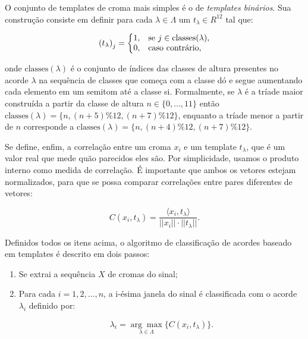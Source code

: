     O conjunto de templates de croma mais simples é o de \textit{templates binários}. Sua construção consiste em definir para cada $\lambda \in \Lambda$ um $t_\lambda \in R^{12}$ tal que:
    
    \[
        {(t_\lambda)}_j = \left\{
            \begin{array}{@{}ll@{}}
                1, & \textrm{se}\ j \in \mbox{classes}(\lambda)\mbox{,} \\
                0, & \textrm{caso contrário}\mbox{,}
            \end{array}\right.
    \]
    
    \noindent onde $\mbox{classes}(\lambda)$ é o conjunto de índices das classes de altura presentes no acorde $\lambda$ na sequência de classes que começa com a classe dó e segue aumentando cada elemento em um semitom até a classe si. Formalmente, se $\lambda$ é a tríade maior construída a partir da classe de altura $n\in\{0,\ldots,11\}$ então $\mbox{classes}(\lambda)=\{n,(n+5)\% 12,(n+7)\% 12\}$, enquanto a tríade menor a partir de $n$ corresponde a $\mbox{classes}(\lambda)=\{n,(n+4)\% 12,(n+7)\% 12\}$.

    Se define, enfim, a correlação entre um croma $x_i$ e um template $t_\lambda$, que é um valor real que mede quão parecidos eles são. Por simplicidade, usamos o produto interno como medida de correlação. É importante que ambos os vetores estejam normalizados, para que se possa comparar correlações entre pares diferentes de vetores:
    
    \[
        C(x_i, t_\lambda) =
            \frac{\langle x_i, t_\lambda \rangle}{||x_i|| \cdot ||t_\lambda||}\mbox{.}
    \]
    
    Definidos todos os itens acima, o algoritmo de classificação de acordes baseado em templates é descrito em dois passos:

    \begin{enumerate}
        \item Se extrai a sequência $X$ de cromas do sinal;
        \item Para cada $i = 1, 2, \dots, n$, a i-ésima janela do sinal       é classificada com o acorde $\lambda_i$ definido por:
        
        \[
            \lambda_i = \underset{\lambda \in \Lambda}{\arg \max}\{C(x_i, t_\lambda)\}\mbox{.}
        \]
        
    \end{enumerate}

